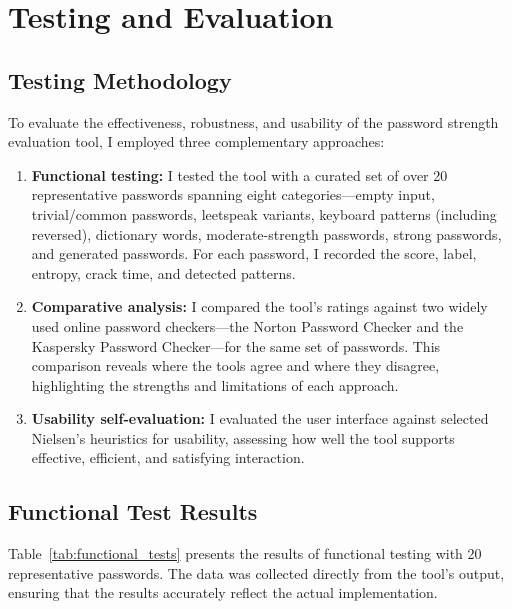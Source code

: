 \chapter{Testing and Evaluation}

\section{Testing Methodology}

To evaluate the effectiveness, robustness, and usability of the password strength evaluation tool, I employed three complementary approaches:

\begin{enumerate}
    \item \textbf{Functional testing:} I tested the tool with a curated set of over 20 representative passwords spanning eight categories---empty input, trivial/common passwords, leetspeak variants, keyboard patterns (including reversed), dictionary words, moderate-strength passwords, strong passwords, and generated passwords. For each password, I recorded the score, label, entropy, crack time, and detected patterns.

    \item \textbf{Comparative analysis:} I compared the tool's ratings against two widely used online password checkers---the Norton Password Checker and the Kaspersky Password Checker---for the same set of passwords. This comparison reveals where the tools agree and where they disagree, highlighting the strengths and limitations of each approach.

    \item \textbf{Usability self-evaluation:} I evaluated the user interface against selected Nielsen's heuristics for usability, assessing how well the tool supports effective, efficient, and satisfying interaction.
\end{enumerate}


\section{Functional Test Results}

Table~\ref{tab:functional_tests} presents the results of functional testing with 20 representative passwords. The data was collected directly from the tool's output, ensuring that the results accurately reflect the actual implementation.

